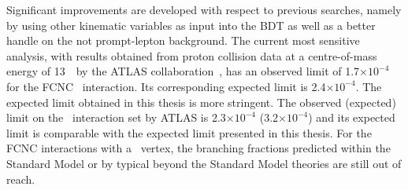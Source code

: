 Significant improvements are developed with respect to previous searches, namely by using other kinematic variables as input into the BDT as well as a better handle on the not prompt-lepton background.  The current  most sensitive analysis, with results obtained from proton collision data at a centre-of-mass energy of 13~\TeV\ by the ATLAS collaboration~\cite{ATLAS-CONF-2017-070}, has an observed limit of 1.7$\times 10^{-4}$ for the FCNC \Zut\ interaction. Its corresponding expected limit is 2.4$\times 10^{-4}$.  The expected limit  obtained in this thesis is more stringent.  The  observed (expected) limit on the \Zct\ interaction set by ATLAS is 2.3$\times 10^{-4}$ (3.2$\times 10^{-4}$) and its expected limit is comparable with the expected limit presented  in this thesis.  For the FCNC interactions with a \tZq\ vertex, the branching fractions predicted within the Standard Model or by typical beyond the Standard Model theories are still out of reach. 



